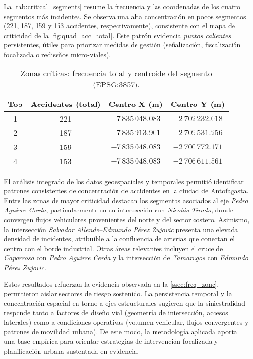 \documentclass[12pt]{article}
\begin{document}
La \autoref{tab:critical_segments} resume la frecuencia y las coordenadas de los cuatro segmentos más incidentes. Se observa una alta concentración en pocos segmentos (221, 187, 159 y 153 accidentes, respectivamente), consistente con el mapa de criticidad de la \autoref{fig:quad_acc_total}. Este patrón evidencia \textit{puntos calientes} persistentes, útiles para priorizar medidas de gestión (señalización, fiscalización focalizada o rediseños micro-viales).

\begin{table}[H]
    \centering
    \caption{Zonas críticas: frecuencia total y centroide del segmento (EPSG:3857).}
    \label{tab:critical_segments}
    \begin{tabular}{cccc}
        \toprule
        \textbf{Top} & \textbf{Accidentes (total)} & \textbf{Centro X (m)} & \textbf{Centro Y (m)} \\
        \midrule
        1 & 221 & $-7\,835\,048.083$ & $-2\,702\,232.018$ \\
        2 & 187 & $-7\,835\,913.901$ & $-2\,709\,531.256$ \\
        3 & 159 & $-7\,835\,048.083$ & $-2\,700\,772.171$ \\
        4 & 153 & $-7\,835\,048.083$ & $-2\,706\,611.561$ \\
        \bottomrule
    \end{tabular}
\end{table}

El análisis integrado de los datos geoespaciales y temporales permitió identificar patrones consistentes de concentración de accidentes en la ciudad de Antofagasta. Entre las zonas de mayor criticidad destacan los segmentos asociados al eje \textit{Pedro Aguirre Cerda}, particularmente en su intersección con \textit{Nicolás Tirado}, donde convergen flujos vehiculares provenientes del norte y del sector costero. Asimismo, la intersección \textit{Salvador Allende–Edmundo Pérez Zujovic} presenta una elevada densidad de incidentes, atribuible a la confluencia de arterias que conectan el centro con el borde industrial. Otras áreas relevantes incluyen el cruce de \textit{Caparrosa} con \textit{Pedro Aguirre Cerda} y la intersección de \textit{Tamarugos} con \textit{Edmundo Pérez Zujovic}.

Estos resultados refuerzan la evidencia observada en la \autoref{ssec:freq_zone}, permitieron aislar sectores de riesgo sostenido. La persistencia temporal y la concentración espacial en torno a ejes estructurales sugieren que la siniestralidad responde tanto a factores de diseño vial (geometría de intersección, accesos laterales) como a condiciones operativas (volumen vehicular, flujos convergentes y patrones de movilidad urbana). De este modo, la metodología aplicada aporta una base empírica para orientar estrategias de intervención focalizada y planificación urbana sustentada en evidencia.
\end{document}
